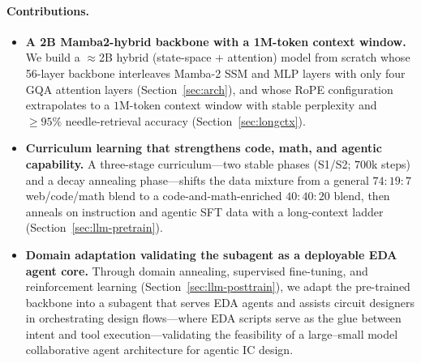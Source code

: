 \paragraph{Contributions.}
\begin{itemize}
\item \textbf{A 2B Mamba2-hybrid backbone with a 1M-token context window.}
We build a $\approx$2B hybrid (state-space + attention) model from scratch whose 56-layer backbone interleaves Mamba-2 SSM and MLP layers with only four GQA attention layers (Section~\ref{sec:arch}), and whose RoPE configuration extrapolates to a $1$M-token context window with stable perplexity and ${\geq}95\%$ needle-retrieval accuracy (Section~\ref{sec:longctx}).

\item \textbf{Curriculum learning that strengthens code, math, and agentic capability.}
A three-stage curriculum---two stable phases (S1/S2; $700$k steps) and a decay annealing phase---shifts the data mixture from a general $74{:}19{:}7$ web/code/math blend to a code-and-math-enriched $40{:}40{:}20$ blend, then anneals on instruction and agentic SFT data with a long-context ladder (Section~\ref{sec:llm-pretrain}).

\item \textbf{Domain adaptation validating the subagent as a deployable EDA agent core.}
Through domain annealing, supervised fine-tuning, and reinforcement learning (Section~\ref{sec:llm-posttrain}), we adapt the pre-trained backbone into a subagent that serves EDA agents and assists circuit designers in orchestrating design flows---where EDA scripts serve as the glue between intent and tool execution---validating the feasibility of a large--small model collaborative agent architecture for agentic IC design.
\end{itemize}
